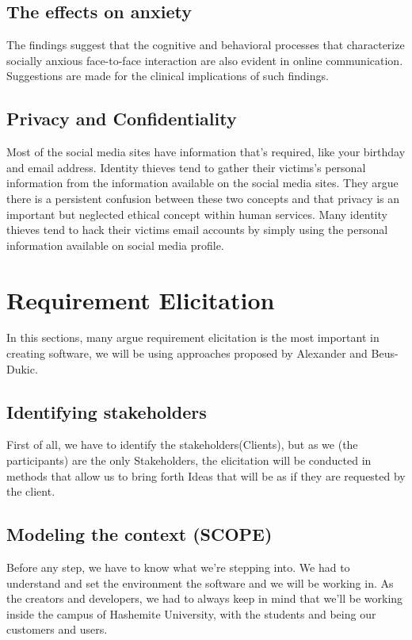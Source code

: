 \documentclass[12pt]{article}
\begin{document}
\subsection{The effects on anxiety}
The findings suggest that the cognitive and behavioral processes that characterize socially anxious face-to-face interaction are also evident in online communication. Suggestions are made for the clinical implications of such findings.\cite{firstone}
\subsection{Privacy and Confidentiality}
Most of the social media sites have information that's required, like your birthday and email address. Identity thieves tend to gather their victims’s personal information from the information available on the social media sites. They argue there is a persistent confusion between these two concepts and that privacy is an important but neglected ethical concept within human services. Many identity thieves tend to hack their victims email accounts by simply using the personal information available on social media profile.\cite{Confidentiality}


\section{Requirement Elicitation}
In this sections, many argue requirement elicitation is the most important in creating software, we will be using approaches proposed by Alexander and Beus-Dukic. \cite{Alexander}

\subsection{Identifying stakeholders} 
First of all, we have to identify the stakeholders(Clients), but as we (the participants) are the only Stakeholders, the elicitation will be conducted in methods that allow us to bring forth Ideas that will be as if they are requested by the client.
\subsection{Modeling the context (SCOPE)}
Before any step, we have to know what we're stepping into.
We had to understand and set the environment the software and we will be working in. As the creators and developers, we had to always keep in mind that we'll be working inside the campus of Hashemite University, with the students and being our customers and users.
\end{document}

